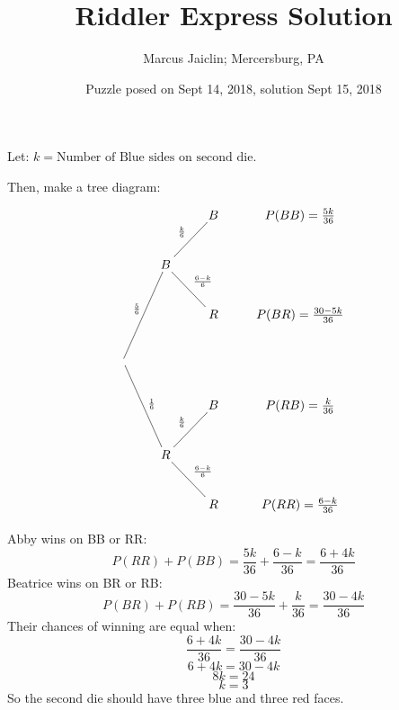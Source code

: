 \documentclass[12pt]{article}
\title{Riddler Express Solution}
\author{Marcus Jaiclin; Mercersburg, PA}
\date{Puzzle posed on Sept 14, 2018, solution Sept 15, 2018}
\begin{document}
\maketitle

Let: $k=\text{Number of Blue sides on second die}$.  

Then, make a tree diagram: 
\[
\xymatrix{
& & B & P(BB) = \frac{5k}{36} \\
& B \ar@{-}[ru]^{\frac{k}{6}}  \ar@{-}[rd]^{\frac{6-k}{6}} & \\
& & R & P(BR) = \frac{30-5k}{36} \\
\ar@{-}[ruu]^{\frac{5}{6}} \ar@{-}[rdd]^{\frac{1}{6}} & & \\
& & B & P(RB) = \frac{k}{36} \\
& R \ar@{-}[ru]^{\frac{k}{6}}  \ar@{-}[rd]^{\frac{6-k}{6}} & \\
& & R & P(RR) = \frac{6-k}{36} \\
}
\]

Abby wins on BB or RR:
\[ P(RR) + P(BB) = \frac{5k}{36} + \frac{6-k}{36} = \frac{6+4k}{36} \]
Beatrice wins on BR or RB:
\[ P(BR) + P(RB) = \frac{30-5k}{36} + \frac{k}{36} = \frac{30-4k}{36} \]
Their chances of winning are equal when:
\[ \frac{6+4k}{36} = \frac{30-4k}{36} \]
\[ 6+4k = 30-4k \]
\[ 8k=24 \]
\[ k=3 \]
So the second die should have three blue and three red faces.
\end{document}

